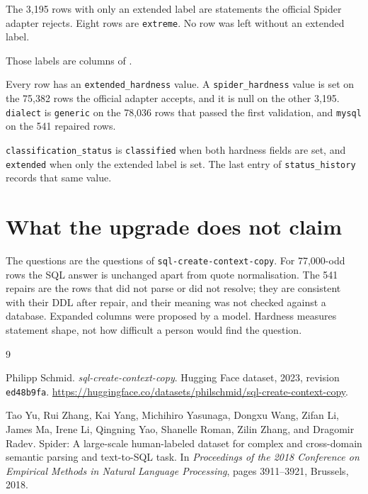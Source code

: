 \documentclass[11pt,a4paper]{article}
\begin{document}
The 3{,}195 rows with only an extended label are statements the official
Spider adapter rejects. Eight rows are \texttt{extreme}. No row was left
without an extended label.

Those labels are columns of .

Every row has an \texttt{extended\_hardness} value.
A \texttt{spider\_hardness} value is set on the 75{,}382 rows the official
adapter accepts, and it is null on the other 3{,}195.
\texttt{dialect} is \texttt{generic} on the 78{,}036 rows that passed the
first validation, and \texttt{mysql} on the 541 repaired rows.

\texttt{classification\_status} is \texttt{classified} when both hardness
fields are set, and \texttt{extended} when only the extended label is set.
The last entry of \texttt{status\_history} records that same value.

\section{What the upgrade does not claim}

The questions are the questions of \texttt{sql-create-context-copy}. For
77{,}000-odd rows the SQL answer is unchanged apart from quote normalisation.
The 541 repairs are the rows that did not parse or did not resolve; they are
consistent with their DDL after repair, and their meaning was not checked
against a database. Expanded columns were proposed by a model. Hardness
measures statement shape, not how difficult a person would find the question.

\begin{thebibliography}{9}

Philipp Schmid.
\newblock \emph{sql-create-context-copy}.
\newblock Hugging Face dataset, 2023, revision \texttt{ed48b9fa}.
\newblock \url{https://huggingface.co/datasets/philschmid/sql-create-context-copy}.

Tao Yu, Rui Zhang, Kai Yang, Michihiro Yasunaga, Dongxu Wang, Zifan Li,
  James Ma, Irene Li, Qingning Yao, Shanelle Roman, Zilin Zhang, and Dragomir Radev.
\newblock Spider: A large-scale human-labeled dataset for complex and
  cross-domain semantic parsing and text-to-SQL task.
\newblock In \emph{Proceedings of the 2018 Conference on Empirical Methods in
  Natural Language Processing}, pages 3911--3921, Brussels, 2018.

\end{thebibliography}
\end{document}
